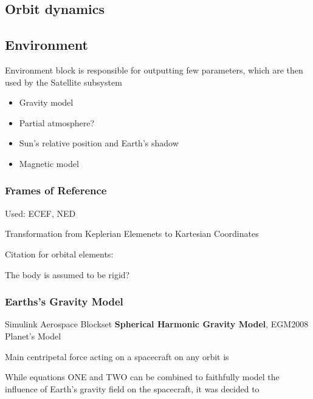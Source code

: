 \subsection{Orbit dynamics}

\subsection{Environment}
    Environment block is responsible for outputting few parameters, which are then used by the Satellite subsystem
    \begin{itemize}
        \item Gravity model
        \item Partial atmosphere?
        \item Sun's relative position and Earth's shadow
        \item Magnetic model
    \end{itemize}

    \subsubsection{Frames of Reference}
        Used: ECEF, NED

        Transformation from Keplerian Elemenets to Kartesian Coordinates


    Citation for orbital elements: \cite{vallado2001fundamentals}

    The body is assumed to be rigid?

    \subsubsection{Earths's Gravity Model}
        Simulink Aerospace Blockset \textbf{Spherical Harmonic Gravity Model}, EGM2008 Planet's Model

        Main centripetal force acting on a spacecraft on any orbit is 


        While equations ONE and TWO can be combined to faithfully model the influence of Earth's gravity field on the spacecraft, it was decided to 


